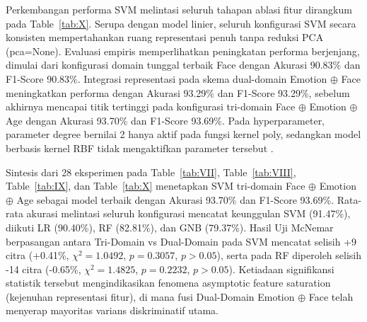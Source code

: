 Perkembangan performa SVM melintasi seluruh tahapan ablasi fitur dirangkum pada Table~\ref{tab:X}. Serupa dengan model linier, seluruh konfigurasi SVM secara konsisten mempertahankan ruang representasi penuh tanpa reduksi PCA (pca=None). Evaluasi empiris memperlihatkan peningkatan performa berjenjang, dimulai dari konfigurasi domain tunggal terbaik Face dengan Akurasi 90.83\% dan F1-Score 90.83\%. Integrasi representasi pada skema dual-domain Emotion $\oplus$ Face meningkatkan performa dengan Akurasi 93.29\% dan F1-Score 93.29\%, sebelum akhirnya mencapai titik tertinggi pada konfigurasi tri-domain Face $\oplus$ Emotion $\oplus$ Age dengan Akurasi 93.70\% dan F1-Score 93.69\%. Pada hyperparameter, parameter degree bernilai 2 hanya aktif pada fungsi kernel poly, sedangkan model berbasis kernel RBF tidak mengaktifkan parameter tersebut \cite{ref51}.

Sintesis dari 28 eksperimen pada Table~\ref{tab:VII}, Table~\ref{tab:VIII}, Table~\ref{tab:IX}, dan Table~\ref{tab:X} menetapkan SVM tri-domain Face $\oplus$ Emotion $\oplus$ Age sebagai model terbaik dengan Akurasi 93.70\% dan F1-Score 93.69\%. Rata-rata akurasi melintasi seluruh konfigurasi mencatat keunggulan SVM (91.47\%), diikuti LR (90.40\%), RF (82.81\%), dan GNB (79.37\%). Hasil Uji McNemar berpasangan antara Tri-Domain vs Dual-Domain pada SVM mencatat selisih +9 citra (+0.41\%, $\chi^2 = 1.0492$, $p = 0.3057$, $p > 0.05$), serta pada RF diperoleh selisih -14 citra (-0.65\%, $\chi^2 = 1.4825$, $p = 0.2232$, $p > 0.05$). Ketiadaan signifikansi statistik tersebut mengindikasikan fenomena asymptotic feature saturation (kejenuhan representasi fitur), di mana fusi Dual-Domain Emotion $\oplus$ Face telah menyerap mayoritas varians diskriminatif utama.
